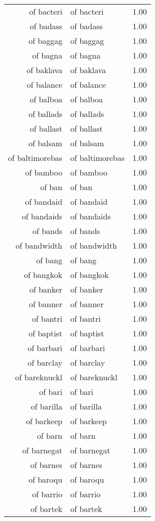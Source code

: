 \begin{table}[ht]
\begin{tabular}{rlr}
  of bacteri & of bacteri & 1.00 \\ 
  of badass & of badass & 1.00 \\ 
  of baggag & of baggag & 1.00 \\ 
  of bagna & of bagna & 1.00 \\ 
  of baklava & of baklava & 1.00 \\ 
  of balance & of balance & 1.00 \\ 
  of balboa & of balboa & 1.00 \\ 
  of ballads & of ballads & 1.00 \\ 
  of ballast & of ballast & 1.00 \\ 
  of balsam & of balsam & 1.00 \\ 
  of baltimorebas & of baltimorebas & 1.00 \\ 
  of bamboo & of bamboo & 1.00 \\ 
  of ban & of ban & 1.00 \\ 
  of bandaid & of bandaid & 1.00 \\ 
  of bandaids & of bandaids & 1.00 \\ 
  of bands & of bands & 1.00 \\ 
  of bandwidth & of bandwidth & 1.00 \\ 
  of bang & of bang & 1.00 \\ 
  of bangkok & of bangkok & 1.00 \\ 
  of banker & of banker & 1.00 \\ 
  of banner & of banner & 1.00 \\ 
  of bantri & of bantri & 1.00 \\ 
  of baptist & of baptist & 1.00 \\ 
  of barbari & of barbari & 1.00 \\ 
  of barclay & of barclay & 1.00 \\ 
  of bareknuckl & of bareknuckl & 1.00 \\ 
  of bari & of bari & 1.00 \\ 
  of barilla & of barilla & 1.00 \\ 
  of barkeep & of barkeep & 1.00 \\ 
  of barn & of barn & 1.00 \\ 
  of barnegat & of barnegat & 1.00 \\ 
  of barnes & of barnes & 1.00 \\ 
  of baroqu & of baroqu & 1.00 \\ 
  of barrio & of barrio & 1.00 \\ 
  of bartek & of bartek & 1.00 \\ 

\end{tabular}
\end{table}
